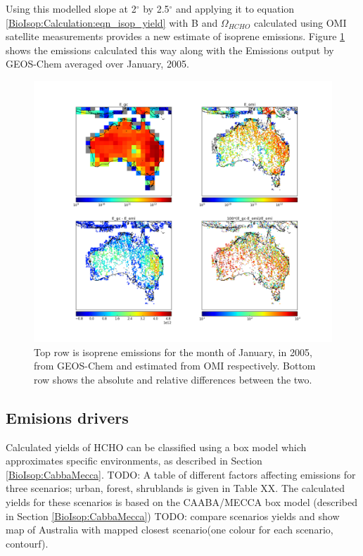     Using this modelled slope at 2$^{\circ}$ by 2.5$^{\circ}$ and applying it to equation \ref{BioIsop:Calculation:eqn_isop_yield} with B and $\Omega_{HCHO}$ calculated using OMI satellite measurements provides a new estimate of isoprene emissions.
    Figure \ref{BioIsop:Calculation:fig_E_isop_200501} shows the emissions calculated this way along with the Emissions output by GEOS-Chem averaged over January, 2005.
    \begin{figure}[!htbp]
      \includegraphics[width=\textwidth]{Figures/Isoprene/E_Comparison.png}
      \caption{%
        Top row is isoprene emissions for the month of January, in 2005, from GEOS-Chem and estimated from OMI respectively.
        Bottom row shows the absolute and relative differences between the two.
      }
      \label{BioIsop:Calculation:fig_E_isop_200501}
    \end{figure}
  
  \subsection{Emisions drivers}
    Calculated yields of HCHO can be classified using a box model which approximates specific environments, as described in Section \ref{BioIsop:CabbaMecca}.
    TODO: A table of different factors affecting emissions for three scenarios; urban, forest, shrublands is given in Table XX.
    The calculated yields for these scenarios is based on the CAABA/MECCA box model (described in Section \ref{BioIsop:CabbaMecca}) TODO: compare scenarios yields and show map of Australia with mapped closest scenario(one colour for each scenario, contourf).
    
